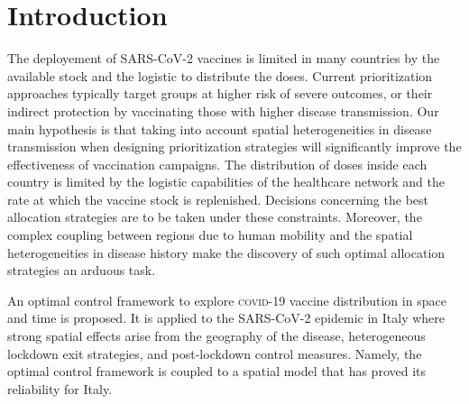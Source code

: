 \section{Introduction}
The deployement of SARS-CoV-2 vaccines is limited in many countries by the available stock and the logistic to distribute the doses\cite[-2\baselineskip]{Khamsi:IfCoronavirusVaccine:2020,NationalAcademiesofSciencesEngineeringandMedicine:FrameworkEquitableAllocation:2020}. Current prioritization approaches typically target groups at higher risk of severe outcomes\cite{Spassiani:VaccinationCriteriaBased:2020, Matrajt:VaccineOptimizationCOVID19:2020}, or their indirect protection by vaccinating those with higher disease transmission\cite{%
Gallagher:IndirectBenefitsAre:2021,Tuite:AlternativeDoseAllocation:2021}. Our main hypothesis is that taking into account spatial heterogeneities in disease transmission when designing prioritization strategies will significantly improve the effectiveness of vaccination campaigns.
The distribution of doses inside each country is limited by the logistic capabilities of the healthcare network and the rate at which the vaccine stock is replenished. Decisions concerning the best allocation strategies are to be taken under these constraints. Moreover, the complex coupling between regions due to human mobility and the spatial heterogeneities in disease history make the discovery of such optimal allocation strategies an arduous task.

An optimal control framework to explore \textsc{covid}-19 vaccine distribution in space and time is proposed. It is applied to the SARS-CoV-2 epidemic in Italy where strong spatial effects arise from the geography of the disease, heterogeneous lockdown exit strategies, and post-lockdown control measures\cite[-4.5\baselineskip]{Marziano:RetrospectiveAnalysisItalian:2021}. Namely, the optimal control framework is coupled to a spatial model that has proved its reliability for Italy\cite{Gatto:SpreadDynamicsCOVID19:2020,Bertuzzo:GeographyCOVID19Spread:2020}. 

